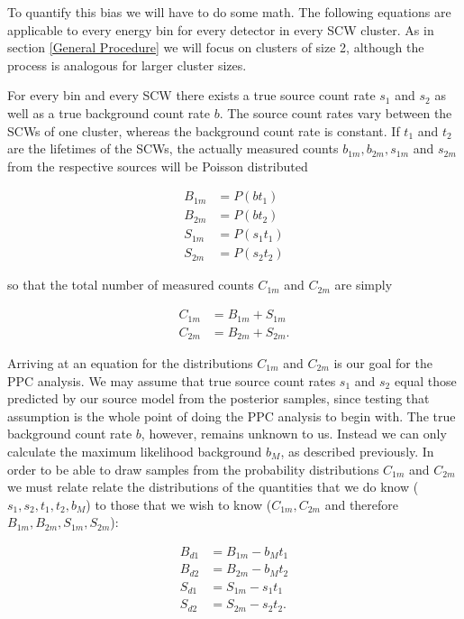 \documentclass{report}
\begin{document}
To quantify this bias we will have to do some math. The following equations are applicable to every energy bin for every detector in every SCW cluster. As in section \ref{General Procedure} we will focus on clusters of size 2, although the process is analogous for larger cluster sizes.

For every bin and every SCW there exists a true source count rate $s_1$ and $s_2$ as well as a true background count rate $b$. The source count rates vary between the SCWs of one cluster, whereas the background count rate is constant. If $t_1$ and $t_2$ are the lifetimes of the SCWs, the actually measured counts $b_{1m}, b_{2m}, s_{1m}$ and $s_{2m}$ from the respective sources will be Poisson distributed

\begin{align} \label{eq measured counts}
    B_{1m} &= P(bt_1) \\
    B_{2m} &= P(bt_2) \\
    S_{1m} &= P(s_1t_1) \\
    S_{2m} &= P(s_2t_2)
\end{align}

so that the total number of measured counts $C_{1m}$ and $C_{2m}$ are simply

\begin{align} \label{eq tot counts ppc}
    C_{1m} &= B_{1m} + S_{1m} \\
    C_{2m} &= B_{2m} + S_{2m}.
\end{align}

Arriving at an equation for the distributions $C_{1m}$ and $C_{2m}$ is our goal for the PPC analysis. We may assume that true source count rates $s_1$ and $s_2$ equal those predicted by our source model from the posterior samples, since testing that assumption is the whole point of doing the PPC analysis to begin with. The true background count rate $b$, however, remains unknown to us. Instead we can only calculate the maximum likelihood background $b_M$, as described previously. In order to be able to draw samples from the probability distributions $C_{1m}$ and $C_{2m}$ we must relate relate the distributions of the quantities that we do know ($s_1, s_2, t_1, t_2, b_M$) to those that we wish to know ($C_{1m}, C_{2m}$ and therefore $B_{1m}, B_{2m}, S_{1m}, S_{2m}$):

\begin{align} \label{eq ppc dif}
    B_{d1} &= B_{1m} - b_Mt_1 \\
    B_{d2} &= B_{2m} - b_Mt_2 \\
    S_{d1} &= S_{1m} - s_1t_1 \\
    S_{d2} &= S_{2m} - s_2t_2.
\end{align}
\end{document}
